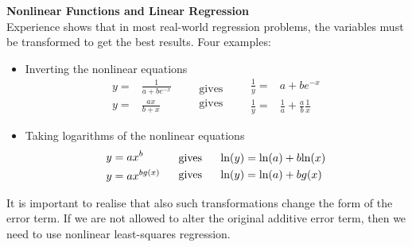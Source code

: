 \textbf{Nonlinear Functions and Linear Regression}\\
Experience shows that in most real-world regression problems, the variables must be transformed to get the best results. Four examples:
\begin{itemize}
  \item Inverting the nonlinear equations
  \begin{equation}
    \begin{split}
      y =& \frac{1}{a+be^{-x}}\\
      y =& \frac{ax}{b+x}
    \end{split}
    \;\;\;\;\;\;
    \begin{split}
      \text{gives}\\
      \text{gives}
    \end{split}
    \;\;\;\;\;\;
    \begin{split}
      \frac{1}{y} =& a + be^{-x}\\
      \frac{1}{y} =& \frac{1}{a} + \frac{a}{b} \frac{1}{x}
    \end{split}
  \end{equation}
  \item Taking logarithms of the nonlinear equations
  \begin{equation}
    \begin{split}
        y &= ax^b\\
        y &= ax^{bg(x)}
    \end{split}
    \;\;\;\;\;\;
    \begin{split}
      \text{gives}\\
      \text{gives}
    \end{split}
    \;\;\;\;\;\;
    \begin{split}
      \textup{ln}(y) &= \textup{ln}(a) + b\textup{ln}(x)\\
      \textup{ln}(y) &= \textup{ln}(a) + bg(x)
    \end{split}
  \end{equation}
\end{itemize}
It is important to realise that also such transformations change the form of the error term. If we are not allowed to alter the original additive error term, then we need to use nonlinear least-squares regression.


